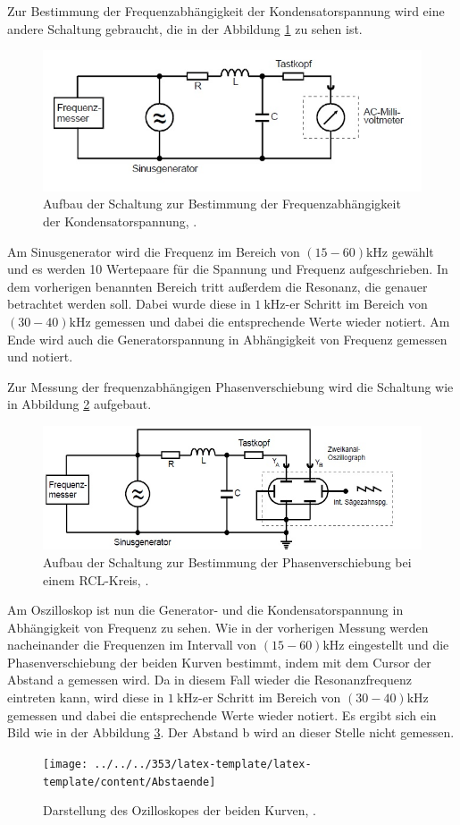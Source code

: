 Zur Bestimmung der Frequenzabhängigkeit der Kondensatorspannung wird eine andere Schaltung gebraucht, die in der Abbildung \ref{fig:frequenz} zu sehen ist. 
\begin{figure}[h!]
	\centering
	\includegraphics[width=0.8\linewidth]{frequenz}
	\caption{Aufbau der Schaltung zur Bestimmung der Frequenzabhängigkeit der Kondensatorspannung, \cite[12]{anleitung354}.}
	\label{fig:frequenz}
\end{figure}
Am Sinusgenerator wird die Frequenz im Bereich von $(15-60)\si{\kHz}$ gewählt und es werden 10 Wertepaare für die Spannung und Frequenz aufgeschrieben. In dem vorherigen benannten Bereich tritt außerdem die Resonanz, die genauer betrachtet werden soll. Dabei wurde diese in $\SI{1}{\kHz}$-er Schritt im Bereich von $(30-40)\si{\kHz}$ gemessen und dabei die entsprechende Werte wieder notiert.
Am Ende wird auch die Generatorspannung in Abhängigkeit von Frequenz gemessen und notiert.

Zur Messung der frequenzabhängigen Phasenverschiebung wird die Schaltung wie in Abbildung \ref{fig:freqab} aufgebaut. 
\begin{figure}[h!]
	\centering
	\includegraphics[width=0.8\linewidth]{freqab}
	\caption{Aufbau der Schaltung zur Bestimmung der Phasenverschiebung bei einem RCL-Kreis, \cite[13]{anleitung354}.}
	\label{fig:freqab}
\end{figure}
Am Oszilloskop ist nun die Generator- und die Kondensatorspannung in Abhängigkeit von Frequenz zu sehen. Wie in der vorherigen Messung werden nacheinander die Frequenzen im Intervall 
von $(15-60)\si{\kHz}$ eingestellt und die Phasenverschiebung der beiden Kurven bestimmt, indem mit dem Cursor der Abstand a gemessen wird. Da in diesem Fall wieder die Resonanzfrequenz eintreten kann, wird diese in $\SI{1}{\kHz}$-er Schritt im Bereich von $(30-40)\si{\kHz}$ gemessen und dabei die entsprechende Werte wieder notiert. Es ergibt sich ein Bild wie in der Abbildung \ref{fig:abstaende}. Der Abstand b wird an dieser Stelle nicht gemessen.
\begin{figure}[h!]
	\centering
	\texttt{[image: ../../../353/latex-template/latex-template/content/Abstaende]}
	\caption{Darstellung des Ozilloskopes der beiden Kurven, \cite[7]{anleitung353}.}
	\label{fig:abstaende}
\end{figure}

